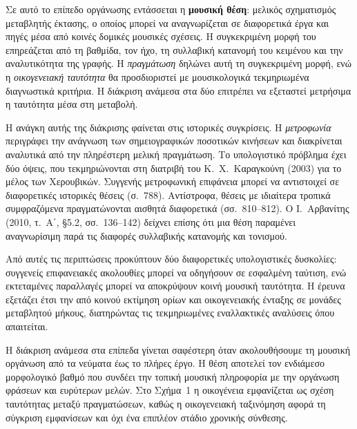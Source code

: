 \documentclass[11pt,a4paper]{article}
\begin{document}
Σε αυτό το επίπεδο οργάνωσης εντάσσεται η \textbf{μουσική θέση}: μελικός σχηματισμός μεταβλητής έκτασης, ο οποίος μπορεί να αναγνωρίζεται σε διαφορετικά έργα και πηγές μέσα από κοινές δομικές μουσικές σχέσεις. Η συγκεκριμένη μορφή του επηρεάζεται από τη βαθμίδα, τον ήχο, τη συλλαβική κατανομή του κειμένου και την αναλυτικότητα της γραφής. Η \emph{πραγμάτωση} δηλώνει αυτή τη συγκεκριμένη μορφή, ενώ η \emph{οικογενειακή ταυτότητα} θα προσδιοριστεί με μουσικολογικά τεκμηριωμένα διαγνωστικά κριτήρια. Η διάκριση ανάμεσα στα δύο επιτρέπει να εξεταστεί μετρήσιμα η ταυτότητα μέσα στη μεταβολή.

Η ανάγκη αυτής της διάκρισης φαίνεται στις ιστορικές συγκρίσεις. Η \emph{μετροφωνία} περιγράφει την ανάγνωση των σημειογραφικών ποσοτικών κινήσεων και διακρίνεται αναλυτικά από την πληρέστερη μελική πραγμάτωση. Το υπολογιστικό πρόβλημα έχει δύο όψεις, που τεκμηριώνονται στη διατριβή του Κ.~Χ.~Καραγκούνη (2003) για το μέλος των Χερουβικών. Συγγενής μετροφωνική επιφάνεια μπορεί να αντιστοιχεί σε διαφορετικές ιστορικές θέσεις (σ.~788). Αντίστροφα, θέσεις με ιδιαίτερα τροπικά συμφραζόμενα πραγματώνονται αισθητά διαφορετικά (σσ.~810--812). Ο Ι.~Αρβανίτης (2010, τ.~Α΄, §5.2, σσ.~136--142) δείχνει επίσης ότι μια θέση παραμένει αναγνωρίσιμη παρά τις διαφορές συλλαβικής κατανομής και τονισμού.

Από αυτές τις περιπτώσεις προκύπτουν δύο διαφορετικές υπολογιστικές δυσκολίες: συγγενείς επιφανειακές ακολουθίες μπορεί να οδηγήσουν σε εσφαλμένη ταύτιση, ενώ εκτεταμένες παραλλαγές μπορεί να αποκρύψουν κοινή μουσική ταυτότητα. Η έρευνα εξετάζει έτσι την από κοινού εκτίμηση ορίων και οικογενειακής ένταξης σε μονάδες μεταβλητού μήκους, διατηρώντας τις τεκμηριωμένες εναλλακτικές αναλύσεις όπου απαιτείται.

Η διάκριση ανάμεσα στα επίπεδα γίνεται σαφέστερη όταν ακολουθήσουμε τη μουσική οργάνωση από τα νεύματα έως το πλήρες έργο. Η θέση αποτελεί τον ενδιάμεσο μορφολογικό βαθμό που συνδέει την τοπική μουσική πληροφορία με την οργάνωση φράσεων και ευρύτερων μελών. Στο Σχήμα~1 η οικογένεια εμφανίζεται ως σχέση ταυτότητας μεταξύ πραγματώσεων, καθώς η οικογενειακή ταξινόμηση αφορά τη σύγκριση εμφανίσεων και όχι ένα επιπλέον στάδιο χρονικής σύνθεσης.
\end{document}
